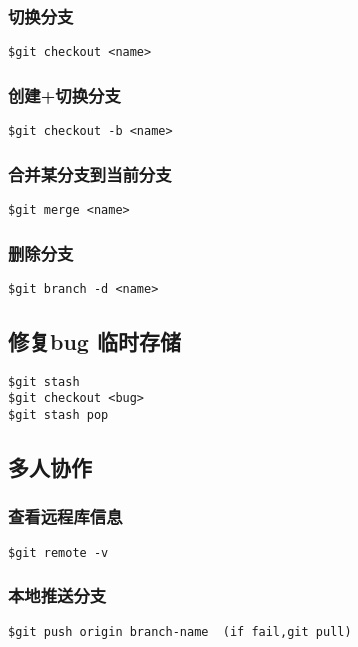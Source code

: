 \subsubsection{切换分支}
\begin{lstlisting}
$git checkout <name>
\end{lstlisting}

\subsubsection{创建+切换分支}
\begin{lstlisting}
$git checkout -b <name>
\end{lstlisting}

\subsubsection{合并某分支到当前分支}
\begin{lstlisting}
$git merge <name>
\end{lstlisting}

\subsubsection{删除分支}
\begin{lstlisting}
$git branch -d <name>
\end{lstlisting}

\subsection{修复bug 临时存储}
\begin{lstlisting}
$git stash
$git checkout <bug>
$git stash pop
\end{lstlisting}

\subsection{多人协作}
\subsubsection{查看远程库信息}
\begin{lstlisting}
$git remote -v
\end{lstlisting}

\subsubsection{本地推送分支}
\begin{lstlisting}
$git push origin branch-name  (if fail,git pull)
\end{lstlisting}

